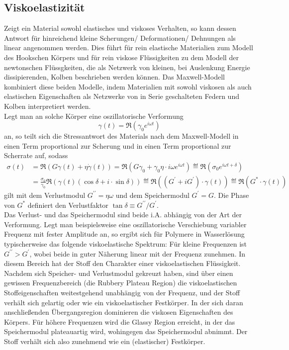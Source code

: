 \documentclass[11pt,a4paper,oneside]{scrartcl}
\begin{document}
\subsection{Viskoelastizität}
Zeigt ein Material sowohl elastisches und viskoses Verhalten, so kann dessen Antwort für hinreichend kleine Scherungen/ Deformationen/ Dehnungen als linear angenommen werden. Dies führt für rein elastische Materialien zum Modell des Hookschen Körpers und für rein viskose Flüssigkeiten zu dem Modell der newtonschen Flüssgkeiten, die als Netzwerk von kleinen, bei Auslenkung Energie dissipierenden, Kolben beschrieben werden können. Das Maxwell-Modell kombiniert diese beiden Modelle, indem Materialien mit sowohl viskosen als auch elastischen Eigenschaften als Netzwerke von in  Serie geschalteten Federn und Kolben interpretiert werden.\\
Legt man an solche Körper eine oszillatorische Verformung 
\begin{equation}
\gamma(t)=\Re\left(\gamma_0 e^{i\omega t}\right)
\end{equation}
an, so teilt sich die Stressantwort des Materials nach dem Maxwell-Modell in einen Term proportional zur Scherung und in einen Term proportional zur Scherrate auf, sodass
\begin{align}
\sigma(t)&=\Re\left(G\gamma(t)+\eta\dot\gamma(t)\right)=\Re\left(G\gamma_0+\gamma_0\eta\cdot i\omega  e^{i\omega t}\right)\eqdef \Re\left(\sigma_0 e^{i\omega t+\delta} \right)\\
\quad& =\frac{\sigma_0}{\gamma_0}\Re\left(\gamma(t)(\cos\delta+i\cdot\sin\delta)\right)\eqdef\Re\left( (G^\prime+iG^\prime)\cdot\gamma(t)\right)\eqdef \Re\left(G^*\cdot\gamma(t)\right)
\end{align}
gilt mit dem Verlustmodul $G^{\prime\prime}=\eta\omega$ und dem Speichermodul $G^\prime=G$. Die Phase von $G^*$ definiert den Verlustfaktor $\tan\delta \equiv G^{\prime\prime}/G^{\prime}$.\\
Das Verlust- und das Speichermodul sind beide i.A. abhängig von der Art der Verformung. Legt man beispielsweise eine oszillatorische Verschiebung variabler Frequenz mit fester Amplitude an, so ergibt sich für Polymere in Wasserlösung typischerweise das folgende viskoelastische Spektrum:
Für kleine Frequenzen ist $G^{\prime\prime}>G^{\prime}$, wobei beide in guter Näherung linear mit der Frequenz zunehmen. In diesem Bereich hat der Stoff den Charakter einer viskoelastischen Flüssigkeit. Nachdem sich Speicher- und Verlustmodul gekreuzt haben, sind über einen gewissen Frequenzbereich (die Rubbery Plateau Region) die viskoelastischen Stoffeigenschaften weitestgehend unabhängig von der Frequenz, und der Stoff verhält sich gelartig oder wie ein viskoelastischer Festkörper. In der sich daran anschließenden Übergangsregion dominieren die viskosen Eigenschaften des Körpers. Für höhere Frequenzen wird die Glassy Region erreicht, in der das Speichermodul plateauartig wird, wohingegen das Speichermodul abnimmt. Der Stoff verhält sich also zunehmend wie ein (elastischer) Festkörper.
\end{document}
